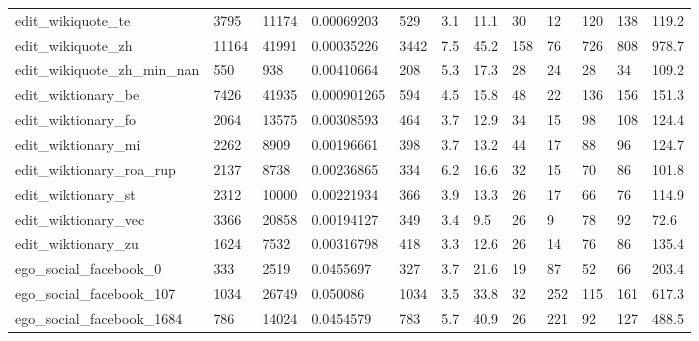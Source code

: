 \begin{longtable}{llllllllllll}
 edit\_wikiquote\_te                                  & 3795       & 11174     & 0.00069203  & 529   & 3.1    & 11.1   & 30    & 12     & 120    & 138    & 119.2   \\
 edit\_wikiquote\_zh                                  & 11164      & 41991     & 0.00035226  & 3442  & 7.5    & 45.2   & 158   & 76     & 726    & 808    & 978.7   \\
 edit\_wikiquote\_zh\_min\_nan                          & 550        & 938       & 0.00410664  & 208   & 5.3    & 17.3   & 28    & 24     & 28     & 34     & 109.2   \\
 edit\_wiktionary\_be                                 & 7426       & 41935     & 0.000901265 & 594   & 4.5    & 15.8   & 48    & 22     & 136    & 156    & 151.3   \\
 edit\_wiktionary\_fo                                 & 2064       & 13575     & 0.00308593  & 464   & 3.7    & 12.9   & 34    & 15     & 98     & 108    & 124.4   \\
 edit\_wiktionary\_mi                                 & 2262       & 8909      & 0.00196661  & 398   & 3.7    & 13.2   & 44    & 17     & 88     & 96     & 124.7   \\
 edit\_wiktionary\_roa\_rup                            & 2137       & 8738      & 0.00236865  & 334   & 6.2    & 16.6   & 32    & 15     & 70     & 86     & 101.8   \\
 edit\_wiktionary\_st                                 & 2312       & 10000     & 0.00221934  & 366   & 3.9    & 13.3   & 26    & 17     & 66     & 76     & 114.9   \\
 edit\_wiktionary\_vec                                & 3366       & 20858     & 0.00194127  & 349   & 3.4    & 9.5    & 26    & 9      & 78     & 92     & 72.6    \\
 edit\_wiktionary\_zu                                 & 1624       & 7532      & 0.00316798  & 418   & 3.3    & 12.6   & 26    & 14     & 76     & 86     & 135.4   \\
 ego\_social\_facebook\_0                              & 333        & 2519      & 0.0455697   & 327   & 3.7    & 21.6   & 19    & 87     & 52     & 66     & 203.4   \\
 ego\_social\_facebook\_107                            & 1034       & 26749     & 0.050086    & 1034  & 3.5    & 33.8   & 32    & 252    & 115    & 161    & 617.3   \\
 ego\_social\_facebook\_1684                           & 786        & 14024     & 0.0454579   & 783   & 5.7    & 40.9   & 26    & 221    & 92     & 127    & 488.5   \\

\end{longtable}
